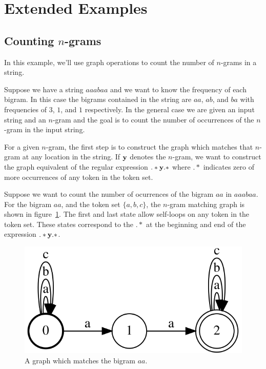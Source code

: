 \section{Extended Examples}
\label{sec:extended_examples}

\subsection{Counting $n$-grams}

In this example, we'll use graph operations to count the number of $n$-grams in
a string.

Suppose we have a string $aaabaa$ and we want to know the frequency of each
bigram. In this case the bigrams contained in the string are $aa$, $ab$, and
$ba$ with frequencies of $3$, $1$, and $1$ respectively. In the general case we
are given an input string and an $n$-gram and the goal is to count the number
of occurrences of the $n$-gram in the input string.

For a given $n$-gram, the first step is to construct the graph which matches
that $n$-gram at any location in the string. If ${\bf y}$ denotes the $n$-gram, we
want to construct the graph equivalent of the regular expression $.*{\bf y}.*$
where $.*$ indicates zero of more occurrences of any token in the token set.

Suppose we want to count the number of ocurrences of the bigram $aa$ in
$aaabaa$. For the bigram $aa$, and the token set $\{a, b, c\}$, the $n$-gram
matching graph is shown in figure~\ref{fig:bigram_aa}. The first and last state
allow self-loops on any token in the token set. These states correspond to the
$.*$ at the beginning and end of the expression $.*{\bf y}.*$.

\begin{figure}
    \centering
    \includegraphics[scale=\dotscale]{figures/bigram_aa}
    \caption{A graph which matches the bigram $aa$.}
    \label{fig:bigram_aa}
\end{figure}

